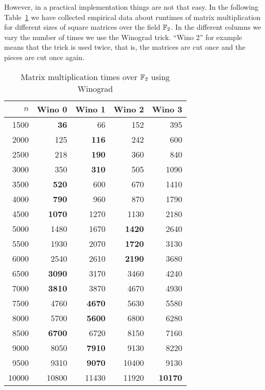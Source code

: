 However, in a practical implementation things are not that easy. In
the following Table~\ref{MatMulWinograd2} we have collected empirical
data about runtimes of matrix multiplication for different sizes of
square matrices over the field $\mathbb{F}_2$. In the different columns we vary
the number of times we use the Winograd trick. ``Wino 2'' for example
means that the trick is used twice, that is, the matrices are cut once
and the pieces are cut once again.

\begin{table}[ht]
\begin{center}
\begin{tabular}{|r||r|r|r|r|}
\hline
$n$ & Wino 0 & Wino 1 & Wino 2 & Wino 3 \\
\hline
1500 & \textbf{36}     &66   & 152    &395      \\
2000 & 125    &\textbf{116}  & 242    &600      \\
2500 & 218    &\textbf{190}  & 360    &840      \\
3000 & 350    &\textbf{310}  & 505    &1090      \\
3500 & \textbf{520}    &600  & 670    &1410      \\
4000 & \textbf{790}    &960  & 870    &1790      \\
4500 & \textbf{1070}   &1270 & 1130   &2180      \\
5000 & 1480   &1670 & \textbf{1420}   &2640      \\
5500 & 1930   &2070 & \textbf{1720}   &3130      \\
6000 & 2540   &2610 & \textbf{2190}   &3680      \\
6500 & \textbf{3090}   &3170 & 3460   &4240      \\
7000 & \textbf{3810}   &3870 & 4670   &4930      \\
7500 & 4760   &\textbf{4670} & 5630   &5580      \\
8000 & 5700   &\textbf{5600} & 6800   &6280      \\
8500 & \textbf{6700}   &6720 & 8150   &7160      \\
9000 & 8050   &\textbf{7910} & 9130   &8220      \\
9500 & 9310   &\textbf{9070} & 10400  &9130      \\
10000 &10800  &11430&  11920 & \textbf{10170}     \\
\hline
\end{tabular}
\end{center}
\caption{Matrix multiplication times over $\mathbb{F}_2$ using Winograd}
\label{MatMulWinograd2}
%
\end{table}

